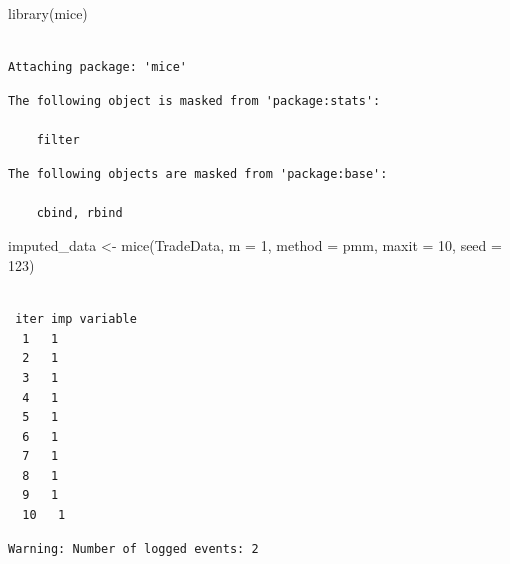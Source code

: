 \documentclass[
  10pt,
]{article}
\newenvironment{Shaded}{\begin{snugshade}}{\end{snugshade}}
\newcommand{\AttributeTok}[1]{\textcolor[rgb]{0.40,0.45,0.13}{#1}}
\newcommand{\DecValTok}[1]{\textcolor[rgb]{0.68,0.00,0.00}{#1}}
\newcommand{\FunctionTok}[1]{\textcolor[rgb]{0.28,0.35,0.67}{#1}}
\newcommand{\NormalTok}[1]{\textcolor[rgb]{0.00,0.23,0.31}{#1}}
\newcommand{\OtherTok}[1]{\textcolor[rgb]{0.00,0.23,0.31}{#1}}
\newcommand{\StringTok}[1]{\textcolor[rgb]{0.13,0.47,0.30}{#1}}
\begin{document}
\begin{Shaded}
\begin{Highlighting}[]
\FunctionTok{library}\NormalTok{(mice)}
\end{Highlighting}
\end{Shaded}

\begin{verbatim}

Attaching package: 'mice'
\end{verbatim}

\begin{verbatim}
The following object is masked from 'package:stats':

    filter
\end{verbatim}

\begin{verbatim}
The following objects are masked from 'package:base':

    cbind, rbind
\end{verbatim}

\begin{Shaded}
\begin{Highlighting}[]
\NormalTok{imputed\_data }\OtherTok{\textless{}{-}} \FunctionTok{mice}\NormalTok{(TradeData, }\AttributeTok{m =} \DecValTok{1}\NormalTok{, }\AttributeTok{method =} \StringTok{\textquotesingle{}pmm\textquotesingle{}}\NormalTok{, }\AttributeTok{maxit =} \DecValTok{10}\NormalTok{, }\AttributeTok{seed =} \DecValTok{123}\NormalTok{)}
\end{Highlighting}
\end{Shaded}

\begin{verbatim}

 iter imp variable
  1   1
  2   1
  3   1
  4   1
  5   1
  6   1
  7   1
  8   1
  9   1
  10   1
\end{verbatim}

\begin{verbatim}
Warning: Number of logged events: 2
\end{verbatim}
\end{document}
